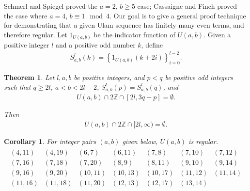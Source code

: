 \documentclass{amsart}
\newcommand{\ZZ}{\mathbb{Z}}
\theoremstyle{theorem}
\newtheorem{theorem}{Theorem}[section]
\newtheorem{corollary}{Corollary}[section]
\theoremstyle{definition}
\begin{document}
\noindent Schmerl and Spiegel \cite{schmerl_spiegel_1994} proved the $a = 2$, $b \geq 5$ case; Cassaigne and Finch \cite{cassaigne_finch_1995} proved the case where $a = 4$, $b \equiv 1 \mod 4$. Our goal is to give a general proof technique for demonstrating that a given Ulam sequence has finitely many even terms, and therefore regular. Let $1_{U(a,b)}$ be the indicator function of $U(a,b)$. Given a positive integer $l$ and a positive odd number $k$, define
	\begin{align*}
    S^l_{a,b}(k) = \left\{1_{U(a,b)}(k + 2i)\right\}_{i = 0}^{l - 2}.
    \end{align*}

\begin{theorem}\label{Regular Theorem}
Let $l, a, b$ be positive integers, and $p < q$ be positive odd integers such that $q \geq 2l$, $a < b < 2l - 2$, $S^l_{a,b}(p) = S^l_{a,b}(q)$, and
	\begin{align*}
    U(a,b) \cap 2\ZZ \cap [2l, 3q - p] = \emptyset.
    \end{align*}
    
\noindent Then
	\begin{align*}
    U(a,b) \cap 2\ZZ \cap [2l,\infty) = \emptyset.
    \end{align*}
\end{theorem}

\begin{corollary}\label{Regular Sequences}
For integer pairs $(a,b)$ given below, $U(a,b)$ is regular.
	\begin{align*}
    \begin{array}{lllllll}
    (4, 11) & (4, 19) & (6, 7) & (6, 11) & (7, 8) & (7, 10) & (7, 12) \\
    (7, 16) & (7, 18) & (7, 20) & (8, 9) & (8, 11) & (9, 10) & (9, 14) \\
    (9, 16) & (9, 20) & (10, 11) & (10, 13) & (10, 17) & (11, 12) & (11, 14) \\
    (11, 16) & (11, 18) & (11, 20) & (12, 13) & (12, 17) & (13, 14)
    \end{array}
    \end{align*}
\end{corollary}
\end{document}
